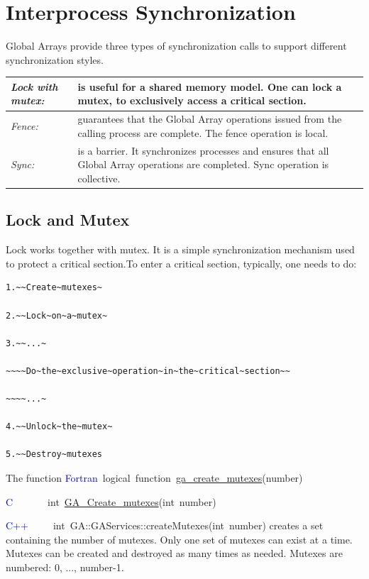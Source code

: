 \chapter{Interprocess Synchronization}

Global Arrays provide three types of synchronization calls to support
different synchronization styles. 

\begin{tabular}{|>{\centering}p{3cm}|>{\raggedright}p{6cm}|}
\hline 
\emph{Lock with mutex:}  & is useful for a shared memory model. One can lock a mutex, to exclusively
access a critical section. \tabularnewline
\hline 
\emph{Fence:}  & guarantees that the Global Array operations issued from the calling
process are complete. The fence operation is local. \tabularnewline
\hline 
\emph{Sync:}  & is a barrier. It synchronizes processes and ensures that all Global
Array operations are completed. Sync operation is collective. \tabularnewline
\hline
\end{tabular}


\section{Lock and Mutex }

Lock works together with mutex. It is a simple synchronization mechanism
used to protect a critical section.To enter a critical section, typically,
one needs to do:
\begin{verbatim}
1.~~Create~mutexes~

2.~~Lock~on~a~mutex~

3.~~...~

~~~~Do~the~exclusive~operation~in~the~critical~section~~

~~~~...~

4.~~Unlock~the~mutex~

5.~~Destroy~mutexes
\end{verbatim}
The function
\textcolor{blue}{Fortran}~logical~function~\href{https://hpc.pnl.gov/globalarrays/api/f_op_api.html#CREATE_MUTEXES}{ga\_{}create\_{}mutexes}(number)~

\textcolor{blue}{C}~~~~~~~int~\href{https://hpc.pnl.gov/globalarrays/api/c_op_api.html#CREATE_MUTEXES}{GA\_{}Create\_{}mutexes}(int~number)~

\textcolor{blue}{C++~}~~~~int~GA::GAServices::createMutexes(int~number)
creates a set containing the number of mutexes. Only one set of mutexes
can exist at a time. Mutexes can be created and destroyed as many
times as needed. Mutexes are numbered: 0, ..., number-1.


